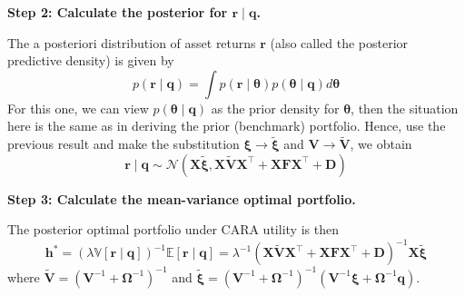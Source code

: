 \documentclass[11pt]{article}
\theoremstyle{plain} %
\newenvironment{topic}
  {\color{C2}\normalfont\begin{framed}\begingroup}
    {\endgroup\end{framed}}
\theoremstyle{remark}
\begin{document}
\begin{topic}
\begin{enumerate}[label=(\alph*), start=2]
          \textbf{Step 2: Calculate the posterior for $\boldsymbol{r} \mid  \boldsymbol{q}$.}

          The a posteriori distribution of asset returns $\boldsymbol{r}$ (also
          called the posterior predictive density) is given by
          $$
            p(\boldsymbol{r} \mid \boldsymbol{q})=\int p(\boldsymbol{r} \mid \boldsymbol{\theta}) p(\boldsymbol{\theta} \mid \boldsymbol{q}) d \boldsymbol{\theta}
          $$
          For this one, we can view $p(\boldsymbol{\theta} \mid \boldsymbol{q})$
          as the prior density for $\boldsymbol{\theta}$, then the situation
          here is the same as in deriving the prior (benchmark) portfolio.
          Hence, use the previous result and make the substitution
          $\boldsymbol{\xi} \rightarrow \widetilde{\boldsymbol{\xi}}$ and
          $\boldsymbol{V} \rightarrow \widetilde{\boldsymbol{V}}$, we obtain
          $$
            \boldsymbol{r} \mid \boldsymbol{q} \sim \mathcal{N}\left(\boldsymbol{X}\widetilde{\boldsymbol{\xi}}, \boldsymbol{X}\boldsymbol{\widetilde{V}}\boldsymbol{X}^\top + \boldsymbol{X}\boldsymbol{F}\boldsymbol{X}^\top + \boldsymbol{D}\right)
          $$

          \textbf{Step 3: Calculate the mean-variance optimal portfolio.}

          The posterior optimal portfolio under CARA utility is then
          $$
            \boldsymbol{h}^*
            =\left(\lambda \mathbb{V}[\boldsymbol{r}\mid \boldsymbol{q}]\right)^{-1} \mathbb{E}[\boldsymbol{r}\mid \boldsymbol{q}]
            =\lambda^{-1} \left(\boldsymbol{X}\boldsymbol{\widetilde{V}}\boldsymbol{X}^\top + \boldsymbol{X}\boldsymbol{F}\boldsymbol{X}^\top + \boldsymbol{D}\right)^{-1} \boldsymbol{X}\boldsymbol{\widetilde{\xi}}
          $$
          where
          $\widetilde{\boldsymbol{V}}=\left(\boldsymbol{V}^{-1}+\boldsymbol{\Omega}^{-1}\right)^{-1}$
          and $\widetilde{\boldsymbol{\xi}}=\left(\boldsymbol{V}^{-1}+\boldsymbol{\Omega}^{-1}\right)^{-1}\left(\boldsymbol{V}^{-1}
            \boldsymbol{\xi}+\boldsymbol{\Omega}^{-1} \boldsymbol{q}\right)$.
  \end{enumerate}
\end{topic}
\end{document}
